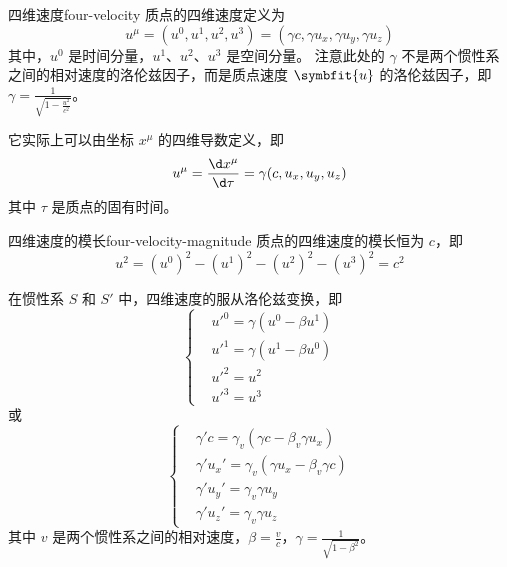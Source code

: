 \begin{definition}{四维速度}{four-velocity}
    质点的四维速度定义为
    \begin{equation}
        u^\mu = (u^0, u^1, u^2, u^3) = \left( \gamma c, \gamma u_x, \gamma u_y, \gamma u_z \right)
    \end{equation}
    其中，$u^0$ 是时间分量，$u^1$、$u^2$、$u^3$ 是空间分量。
    注意此处的 $\gamma$ 不是两个惯性系之间的相对速度的洛伦兹因子，而是质点速度 $\symbfit{u}$ 的洛伦兹因子，即 $\gamma = \frac{1}{\sqrt{1 - \frac{u^2}{c^2}}}$。
\end{definition}

它实际上可以由坐标 $x^\mu$ 的四维导数定义，即
\begin{equation}
    u^\mu = \frac{\d x^\mu}{\d \tau} = \gamma (c, u_x, u_y, u_z)
\end{equation}
其中 $\tau$ 是质点的固有时间。

\begin{theorem}{四维速度的模长}{four-velocity-magnitude}
    质点的四维速度的模长恒为 $c$，即
    \begin{equation}
        u^2 = (u^0)^2 - (u^1)^2 - (u^2)^2 - (u^3)^2 = c^2
    \end{equation}
\end{theorem}

在惯性系 $S$ 和 $S'$ 中，四维速度的服从洛伦兹变换，即
\begin{equation}
    \left\{
    \begin{aligned}
         & u'^0 = \gamma (u^0 - \beta u^1) \\
         & u'^1 = \gamma (u^1 - \beta u^0) \\
         & u'^2 = u^2                      \\
         & u'^3 = u^3
    \end{aligned}
    \right.
\end{equation}
或
\begin{equation}
    \left\{
    \begin{aligned}
         & \gamma' c = \gamma_v (\gamma c - \beta_v \gamma u_x)    \\
         & \gamma' u_x' = \gamma_v (\gamma u_x - \beta_v \gamma c) \\
         & \gamma' u_y' = \gamma_v \gamma u_y                      \\
         & \gamma' u_z' = \gamma_v \gamma u_z
    \end{aligned}
    \right.
    \label{eq:four-velocity-transformation}
\end{equation}
其中 $v$ 是两个惯性系之间的相对速度，$\beta = \frac{v}{c}$，$\gamma = \frac{1}{\sqrt{1 - \beta^2}}$。

